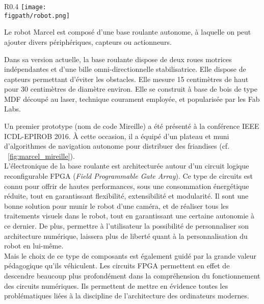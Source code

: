 \documentclass[a4paper,12pt]{report}
\newcommand{\figpath}{figures}
\begin{document}
\begin{wrapfigure}{R}{0.4\textwidth}
	\centering
	\texttt{[image: \\figpath/robot.png]}
	\caption{\label{fig:marcel_mireille}Base roulante Marcel : Prototype \og{}Mireille\fg{}.}
\end{wrapfigure}

Le robot Marcel est composé d'une base roulante autonome, à laquelle on peut ajouter divers périphériques, capteurs ou actionneurs.

Dans sa version actuelle, la base roulante dispose de deux roues motrices indépendantes et d'une bille omni-directionnelle stabilisatrice.
Elle dispose de capteurs permettant d'éviter les obstacles.
Elle mesure 15 centimètres de haut pour 30 centimètres de diamètre environ.
Elle se construit à base de bois de type MDF découpé au laser, technique courament employée, et popularisée par les Fab Labs.

Un premier prototype (nom de code \og{}Mireille\fg{}) a été présenté à la conférence IEEE ICDL-EPIROB 2016.
À cette occasion, il a équipé d'un plateau et muni d'algorithmes de navigation autonome pour distribuer des friandises (cf. \figurename~\ref{fig:marcel_mireille}).\\

L'électronique de la base roulante est architecturée autour d'un circuit logique reconfigurable FPGA (\emph{Field Programmable Gate Array}).
Ce type de circuits est connu pour offrir de hautes performances, sous une consommation énergétique réduite, tout en garantissant flexibilité, extensibilité et modularité.
Il sont une bonne solution pour munir le robot d'une caméra, et de réaliser tous les traitements visuels dans le robot, tout en garantissant une certaine autonomie à ce dernier.
De plus, permettre à l'utilisateur la possibilité de personnaliser son architecture numérique, laissera plus de liberté quant à la personnalisation du robot en lui-même.\\

Mais le choix de ce type de composants est également guidé par la grande valeur pédagogique qu'ils véhiculent.
Les circuits FPGA permettent en effet de descendre beaucoup plus profondément dans la compréhension du fonctionnement des circuits numériques.
Ils permettent de mettre en évidence toutes les problématiques liées à la discipline de l'architecture des ordinateurs modernes.\\
\end{document}
